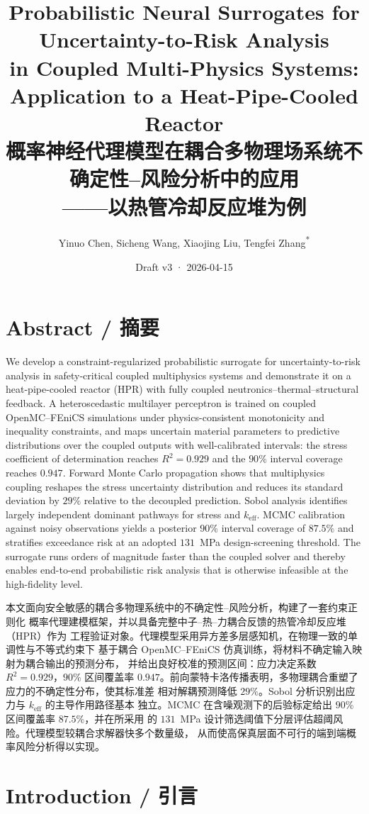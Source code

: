 \documentclass[11pt,a4paper]{article}
\title{\textbf{Probabilistic Neural Surrogates for Uncertainty-to-Risk Analysis\\
in Coupled Multi-Physics Systems:\\
Application to a Heat-Pipe-Cooled Reactor}\\[0.4em]
\large 概率神经代理模型在耦合多物理场系统不确定性--风险分析中的应用\\
——以热管冷却反应堆为例}
\author{Yinuo Chen, Sicheng Wang, Xiaojing Liu, Tengfei Zhang\textsuperscript{*}}
\date{Draft v3 · 2026-04-15}
\newcommand{\keff}{\ensuremath{k_{\mathrm{eff}}}}
\begin{document}
\maketitle

\section*{Abstract / 摘要}

We develop a constraint-regularized probabilistic surrogate for
uncertainty-to-risk analysis in safety-critical coupled multiphysics systems
and demonstrate it on a heat-pipe-cooled reactor (HPR) with fully coupled
neutronics--thermal--structural feedback. A heteroscedastic multilayer
perceptron is trained on coupled OpenMC--FEniCS simulations under
physics-consistent monotonicity and inequality constraints, and maps uncertain
material parameters to predictive distributions over the coupled outputs with
well-calibrated intervals: the stress coefficient of determination reaches
$R^2 = 0.929$ and the $90\%$ interval coverage reaches $0.947$. Forward Monte
Carlo propagation shows that multiphysics coupling reshapes the stress
uncertainty distribution and reduces its standard deviation by $29\%$ relative
to the decoupled prediction. Sobol analysis identifies largely independent
dominant pathways for stress and \keff. MCMC calibration against noisy
observations yields a posterior $90\%$ interval coverage of $87.5\%$ and
stratifies exceedance risk at an adopted $131$~MPa design-screening threshold.
The surrogate runs orders of magnitude faster than the coupled solver and
thereby enables end-to-end probabilistic risk analysis that is otherwise
infeasible at the high-fidelity level.

本文面向安全敏感的耦合多物理系统中的不确定性--风险分析，构建了一套约束正则化
概率代理建模框架，并以具备完整中子--热--力耦合反馈的热管冷却反应堆（HPR）作为
工程验证对象。代理模型采用异方差多层感知机，在物理一致的单调性与不等式约束下
基于耦合 OpenMC--FEniCS 仿真训练，将材料不确定输入映射为耦合输出的预测分布，
并给出良好校准的预测区间：应力决定系数 $R^2 = 0.929$，$90\%$ 区间覆盖率
$0.947$。前向蒙特卡洛传播表明，多物理耦合重塑了应力的不确定性分布，使其标准差
相对解耦预测降低 $29\%$。Sobol 分析识别出应力与 \keff{} 的主导作用路径基本
独立。MCMC 在含噪观测下的后验标定给出 $90\%$ 区间覆盖率 $87.5\%$，并在所采用
的 $131$~MPa 设计筛选阈值下分层评估超阈风险。代理模型较耦合求解器快多个数量级，
从而使高保真层面不可行的端到端概率风险分析得以实现。

\section{Introduction / 引言}
\end{document}
